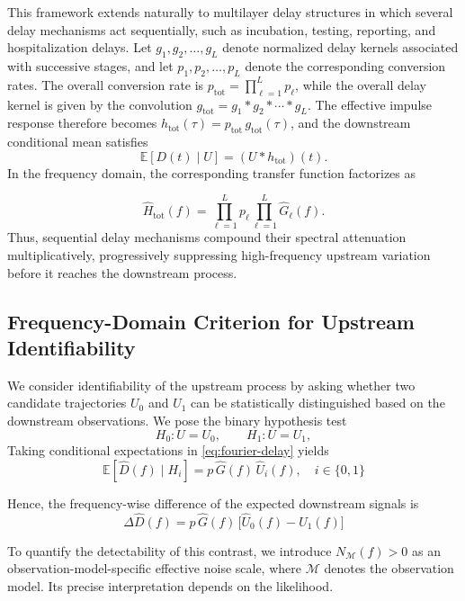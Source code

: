 This framework extends naturally to multilayer delay structures in which several delay mechanisms act sequentially, such as incubation, testing, reporting, and hospitalization delays. Let $g_1,g_2,\ldots,g_L$ denote normalized delay kernels associated with successive stages, and let $p_1,p_2,\ldots,p_L$ denote the corresponding conversion rates. The overall conversion rate is
$p_{\mathrm{tot}}=\prod_{\ell=1}^{L} p_\ell$, while the overall delay kernel is given by the convolution $g_{\mathrm{tot}}=g_1 * g_2 * \cdots * g_L$. The effective impulse response therefore becomes $h_{\mathrm{tot}}(\tau)=p_{\mathrm{tot}}\,g_{\mathrm{tot}}(\tau)$, and the downstream conditional mean satisfies
\[
\mathbb{E}[D(t)\mid U]=(U*h_{\mathrm{tot}})(t).
\]
In the frequency domain, the corresponding transfer function factorizes as

\begin{equation}
\widehat H_{\mathrm{tot}}(f)
=
\prod_{\ell=1}^{L}p_\ell
\prod_{\ell=1}^{L}\widehat G_\ell(f).
\end{equation}
Thus, sequential delay mechanisms compound their spectral attenuation multiplicatively, progressively suppressing high-frequency upstream variation before it reaches the downstream process.


\subsection*{Frequency-Domain Criterion for Upstream Identifiability}

We consider identifiability of the upstream process by asking whether two candidate trajectories \(U_0\) and \(U_1\) can be statistically distinguished based on the downstream observations. We pose the binary hypothesis test
\begin{equation}
H_0: U = U_0,
\qquad
H_1: U = U_1,
\end{equation}
Taking conditional expectations in \eqref{eq:fourier-delay} yields
\begin{equation}
\mathbb{E}[\widehat{D}(f)\mid H_i]=p\,\widehat{G}(f)\,\widehat{U}_i(f), \quad i\in\{0,1\}
\end{equation}

Hence, the frequency-wise difference of the expected downstream signals is
\begin{equation}
\Delta\widehat{D}(f)
= p\,\widehat{G}(f)\,\bigl[\widehat{U}_0(f) - \widehat{U}_1(f)\bigr]
\end{equation}

To quantify the detectability of this contrast, we introduce
\(N_{\mathcal M}(f)>0\) as an observation-model-specific effective noise scale, where \(\mathcal M\) denotes the observation model. Its precise interpretation depends on the likelihood.

